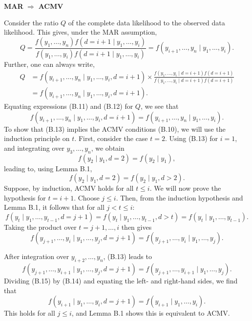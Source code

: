 \documentclass[UTF8,a4paper,10pt]{article}
\begin{document}
\textbf{MAR} $\Rightarrow$ \textbf{ACMV}

Consider the ratio \(Q\) of the complete data likelihood to the observed data likelihood. This gives, under the MAR assumption,
\begin{equation*}
    Q = \frac{f(y_1,\ldots,y_n)f(d = i + 1\mid y_1,\ldots,y_i)}{f(y_1,\ldots,y_i)f(d = i + 1\mid y_1,\ldots,y_i)} = f(y_{i+1},\ldots,y_n\mid y_1,\ldots,y_i). \tag*{(B.11)}
\end{equation*}
Further, one can always write,
\begin{align*}
    Q &= f(y_{i+1},\ldots,y_n\mid y_1,\ldots,y_i, d = i + 1) \times \frac{f(y_1,\ldots,y_i\mid d = i + 1)f(d = i + 1)}{f(y_1,\ldots,y_i\mid d = i + 1)f(d = i + 1)} \\
    &= f(y_{i+1},\ldots,y_n\mid y_1,\ldots,y_i, d = i + 1). \tag*{(B.12)}
\end{align*}
Equating expressions (B.11) and (B.12) for \(Q\), we see that
\begin{equation*}
    f(y_{i+1},\ldots,y_n\mid y_1,\ldots,y_i, d = i + 1) = f(y_{i+1},\ldots,y_n\mid y_1,\ldots,y_i). \tag*{(B.13)}
\end{equation*}
To show that (B.13) implies the ACMV conditions (B.10), we will use the induction principle on \(t\). First, consider the case \(t = 2\). Using (B.13) for \(i = 1\), and integrating over \(y_3,\ldots,y_n\), we obtain
\begin{equation*}
    f(y_2\mid y_1, d = 2) = f(y_2\mid y_1),
\end{equation*}
leading to, using Lemma B.1,
\begin{equation*}
    f(y_2\mid y_1, d = 2) = f(y_2\mid y_1,d>2).
\end{equation*}
Suppose, by induction, ACMV holds for all \(t \leq i\). We will now prove the hypothesis for \(t = i+1\). Choose \(j \leq i\). Then, from the induction hypothesis and Lemma B.1, it follows that for all \(j < t \leq i\):
\begin{equation*}
    f(y_t\mid y_1,\ldots,y_{t-1}, d = j + 1) = f(y_t\mid y_1,\ldots,y_{t-1},d>t) = f(y_t\mid y_1,\ldots,y_{t-1}).
\end{equation*}
Taking the product over \(t = j + 1,\ldots,i\) then gives
\begin{equation*}
    f(y_{j+1},\ldots,y_i\mid y_1,\ldots,y_j , d = j + 1) = f(y_{j+1},\ldots,y_i\mid y_1,\ldots,y_j). \tag*{(B.14)}
\end{equation*}


After integration over \(y_{i+2},\ldots,y_n\), (B.13) leads to
\[
f(y_{j+1},\ldots,y_{i+1}\mid y_1,\ldots,y_j , d = j + 1) = f(y_{j+1},\ldots,y_{i+1}\mid y_1,\ldots,y_j ). \tag*{(B.15)}
\]
Dividing (B.15) by (B.14) and equating the left- and right-hand sides, we
find that
\[
f(y_{i+1}\mid y_1,\ldots,y_i, d = j + 1) = f(y_{i+1}\mid y_1,\ldots,y_i).
\]
This holds for all \(j \leq i\), and Lemma B.1 shows this is equivalent to ACMV.
\end{document}
